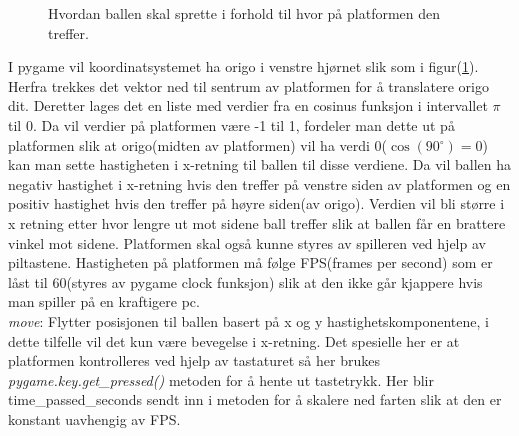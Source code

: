 \documentclass{article}     %
\newcommand{\degree}{\ensuremath{^\circ}} %
\begin{document}
\begin{figure}[h!]
\caption{Hvordan ballen skal sprette i forhold til hvor på platformen den treffer.}
\label{newcoord}
\end{figure}

I pygame vil koordinatsystemet ha origo i venstre hjørnet slik som i figur(\ref{newcoord}). Herfra trekkes det vektor ned til sentrum av platformen for å translatere origo dit. Deretter lages det en liste med verdier fra en cosinus funksjon i intervallet $\pi$ til 0. Da vil verdier på platformen være -1 til 1, fordeler man dette ut på platformen slik at origo(midten av platformen) vil ha verdi 0($\cos(90\degree) = 0$) kan man sette hastigheten i x-retning til ballen til disse verdiene. Da vil ballen ha negativ hastighet i x-retning hvis den treffer på venstre siden av platformen og en positiv hastighet hvis den treffer på høyre siden(av origo). Verdien vil bli større i x retning etter hvor lengre ut mot sidene ball treffer slik at ballen får en brattere vinkel mot sidene.
Platformen skal også kunne styres av spilleren ved hjelp av piltastene. Hastigheten på platformen må følge FPS(frames per second) som er låst til 60(styres av pygame clock funksjon) slik at den ikke går kjappere hvis man spiller på en kraftigere pc.\\

\emph{move}: Flytter posisjonen til ballen basert på x og y hastighetskomponentene, i dette tilfelle vil det kun være bevegelse i x-retning. Det spesielle her er at platformen kontrolleres ved hjelp av tastaturet så her brukes \emph{pygame.key.get\_pressed()} metoden for å hente ut tastetrykk. Her blir time\_passed\_seconds sendt inn i metoden for å skalere ned farten slik at den er konstant uavhengig av FPS.\\\\
\end{document}
